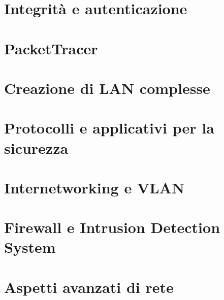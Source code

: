 \section{Integrità e autenticazione}

%

\section{PacketTracer}

%

\section{Creazione di LAN complesse}

%

\section{Protocolli e applicativi per la sicurezza}

%

\section{Internetworking e VLAN}

%

\section{Firewall e Intrusion Detection System}

%

\section{Aspetti avanzati di rete}
